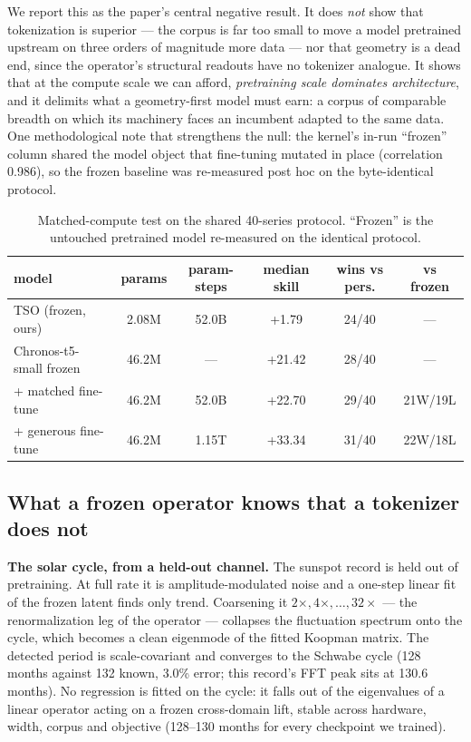 \documentclass{article}
\begin{document}
We report this as the paper's central negative result. It does \emph{not} show
that tokenization is superior --- the corpus is far too small to move a model
pretrained upstream on three orders of magnitude more data --- nor that
geometry is a dead end, since the operator's structural readouts have no
tokenizer analogue. It shows that at the compute scale we can afford,
\emph{pretraining scale dominates architecture}, and it delimits what a
geometry-first model must earn: a corpus of comparable breadth on which its
machinery faces an incumbent adapted to the same data. One methodological note
that strengthens the null: the kernel's in-run ``frozen'' column shared the
model object that fine-tuning mutated in place (correlation 0.986), so the
frozen baseline was re-measured post hoc on the byte-identical protocol.

\begin{table}[t]
\centering\small
\caption{Matched-compute test on the shared 40-series protocol. ``Frozen'' is
the untouched pretrained model re-measured on the identical protocol.}
\label{tab:matched}
\begin{tabular}{lccccc}
\toprule
model & params & param-steps & median skill & wins vs pers. & vs frozen \\
\midrule
TSO (frozen, ours) & 2.08M & 52.0B & +1.79 & 24/40 & --- \\
Chronos-t5-small frozen & 46.2M & --- & +21.42 & 28/40 & --- \\
\quad + matched fine-tune & 46.2M & 52.0B & +22.70 & 29/40 & 21W/19L \\
\quad + generous fine-tune & 46.2M & 1.15T & +33.34 & 31/40 & 22W/18L \\
\bottomrule
\end{tabular}
\end{table}

\subsection{What a frozen operator knows that a tokenizer does not}
\label{sec:geometry}
\textbf{The solar cycle, from a held-out channel.} The sunspot record is held
out of pretraining. At full rate it is amplitude-modulated noise and a one-step
linear fit of the frozen latent finds only trend. Coarsening it
$2\times,4\times,\dots,32\times$ --- the renormalization leg of the operator ---
collapses the fluctuation spectrum onto the cycle, which becomes a clean
eigenmode of the fitted Koopman matrix. The detected period is scale-covariant
and converges to the Schwabe cycle (128 months against
132 known, 3.0\% error; this record's FFT peak sits at
130.6 months). No regression is fitted on the cycle: it falls out of the
eigenvalues of a linear operator acting on a frozen cross-domain lift, stable
across hardware, width, corpus and objective (128--130 months for every
checkpoint we trained).
\end{document}
